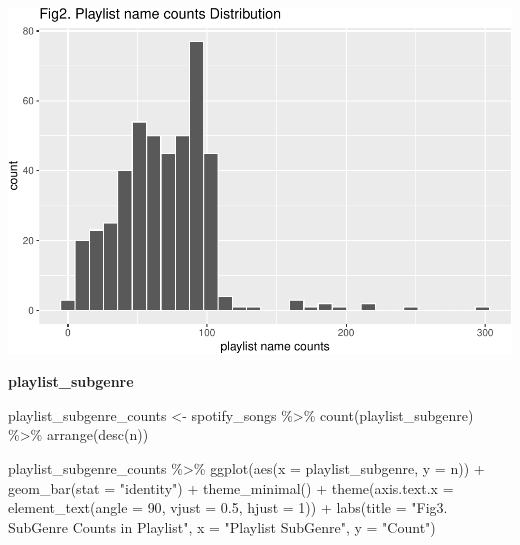 \documentclass[
]{article}
\newenvironment{Shaded}{\begin{snugshade}}{\end{snugshade}}
\newcommand{\AttributeTok}[1]{\textcolor[rgb]{0.77,0.63,0.00}{#1}}
\newcommand{\DecValTok}[1]{\textcolor[rgb]{0.00,0.00,0.81}{#1}}
\newcommand{\FloatTok}[1]{\textcolor[rgb]{0.00,0.00,0.81}{#1}}
\newcommand{\FunctionTok}[1]{\textcolor[rgb]{0.00,0.00,0.00}{#1}}
\newcommand{\NormalTok}[1]{#1}
\newcommand{\OtherTok}[1]{\textcolor[rgb]{0.56,0.35,0.01}{#1}}
\newcommand{\SpecialCharTok}[1]{\textcolor[rgb]{0.00,0.00,0.00}{#1}}
\newcommand{\StringTok}[1]{\textcolor[rgb]{0.31,0.60,0.02}{#1}}
\begin{document}
\includegraphics{Final-Report_files/figure-latex/unnamed-chunk-9-1.pdf}

\textbf{playlist\_subgenre}

\begin{Shaded}
\begin{Highlighting}[]
\NormalTok{playlist\_subgenre\_counts }\OtherTok{\textless{}{-}}\NormalTok{ spotify\_songs }\SpecialCharTok{\%\textgreater{}\%}
  \FunctionTok{count}\NormalTok{(playlist\_subgenre) }\SpecialCharTok{\%\textgreater{}\%}
  \FunctionTok{arrange}\NormalTok{(}\FunctionTok{desc}\NormalTok{(n))}

\NormalTok{playlist\_subgenre\_counts }\SpecialCharTok{\%\textgreater{}\%}
  \FunctionTok{ggplot}\NormalTok{(}\FunctionTok{aes}\NormalTok{(}\AttributeTok{x =}\NormalTok{ playlist\_subgenre, }\AttributeTok{y =}\NormalTok{ n)) }\SpecialCharTok{+}
  \FunctionTok{geom\_bar}\NormalTok{(}\AttributeTok{stat =} \StringTok{"identity"}\NormalTok{) }\SpecialCharTok{+}
  \FunctionTok{theme\_minimal}\NormalTok{() }\SpecialCharTok{+}
  \FunctionTok{theme}\NormalTok{(}\AttributeTok{axis.text.x =} \FunctionTok{element\_text}\NormalTok{(}\AttributeTok{angle =} \DecValTok{90}\NormalTok{, }\AttributeTok{vjust =} \FloatTok{0.5}\NormalTok{, }\AttributeTok{hjust =} \DecValTok{1}\NormalTok{)) }\SpecialCharTok{+}
  \FunctionTok{labs}\NormalTok{(}\AttributeTok{title =} \StringTok{"Fig3. SubGenre Counts in Playlist"}\NormalTok{,}
       \AttributeTok{x =} \StringTok{"Playlist SubGenre"}\NormalTok{,}
       \AttributeTok{y =} \StringTok{"Count"}\NormalTok{)}
\end{Highlighting}
\end{Shaded}
\end{document}

